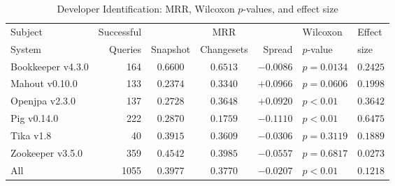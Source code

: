 \begin{table}[t]
\centering
\caption{Developer Identification: MRR, Wilcoxon $p$-values, and effect size}
\begin{tabular}{l|r|ccr|ll}
\toprule
Subject & Successful &    & MRR &        & Wilcoxon  & Effect \\
System  & Queries    & Snapshot & Changesets  & Spread & $p$-value & size \\
\midrule
Bookkeeper v4.3.0 & 164 & $\bm{0.6600}$ & $0.6513$ & $-0.0086$ & $p = 0.0134$ & $0.2425$ \\
Mahout v0.10.0 & 133 & $0.2374$ & $\bm{0.3340}$ & $+0.0966$ & $p = 0.0606$ & $0.1998$ \\
Openjpa v2.3.0 & 137 & $0.2728$ & $\bm{0.3648}$ & $+0.0920$ & $p < 0.01$ & $0.3642$ \\
Pig v0.14.0 & 222 & $\bm{0.2870}$ & $0.1759$ & $-0.1110$ & $p < 0.01$ & $0.6475$ \\
Tika v1.8 & 40 & $\bm{0.3915}$ & $0.3609$ & $-0.0306$ & $p = 0.3119$ & $0.1889$ \\
Zookeeper v3.5.0 & 359 & $\bm{0.4542}$ & $0.3985$ & $-0.0557$ & $p = 0.6817$ & $0.0273$ \\
\midrule
All & 1055 & $\bm{0.3977}$ & $0.3770$ & $-0.0207$ & $p < 0.01$ & $0.1218$ \\
\bottomrule
\end{tabular}
\label{table:triage_rq1}
\end{table}
